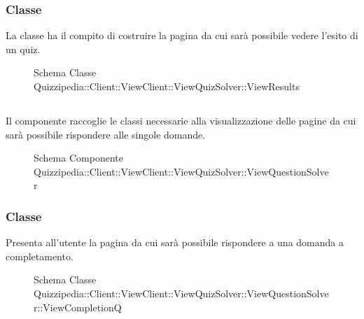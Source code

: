 \subsubsection{Classe }
La classe ha il compito di costruire la pagina da cui sarà possibile vedere l'esito di un quiz.
\begin{figure}[H]
\centering
\noindent{}
\caption[Schema Classe ViewResults]{Schema Classe Quizzipedia::Client::ViewClient::ViewQuizSolver::ViewResults}
\end{figure}
\subsection{}
Il componente raccoglie le classi necessarie alla visualizzazione delle pagine da cui sarà possibile rispondere alle singole domande.
\begin{figure}[H]
\centering
\noindent{}
\caption[Schema Componente Quizzipedia::Client::ViewClient::ViewQuizSolver::ViewQuestionSolver]{Schema Componente Quizzipedia::Client::ViewClient::ViewQuizSolver::ViewQuestionSolver}
\end{figure}
\subsubsection{Classe }
Presenta all'utente la pagina da cui sarà possibile rispondere a una domanda a completamento.
\begin{figure}[H]
\centering
\noindent{}
\caption[Schema Classe ViewCompletionQ]{Schema Classe Quizzipedia::Client::ViewClient::ViewQuizSolver::ViewQuestionSolver::ViewCompletionQ}
\end{figure}
